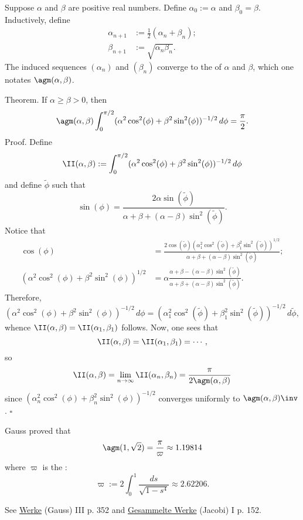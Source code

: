 \documentclass [preview, border = 20pt] {standalone}
\begin{document}
\pagecolor{black}
\color{white}
Suppose $\alpha$ and $\beta$ are positive real numbers. Define $\alpha_0 := \alpha$ and $\beta_0=\beta$. Inductively, define
\begin{align*}
\alpha_{n+1} &:= \frac{1}{2}(\alpha_n + \beta_n);\\
\beta_{n+1} &:= \sqrt{\alpha_n\beta_n}.
\end{align*}
The induced sequences $(\alpha_n)$ and $(\beta_n)$ converge to the  of $\alpha$ and $\beta$, which one notates $\agm (\alpha,\beta)$.

Theorem.\quad
If $\alpha\ge\beta>0$, then
\[
\agm (\alpha,\beta) \int_0^{\pi/2} (\alpha^2\cos^2(\phi) + \beta^2\sin^2(\phi))^{-1/2}\,d\phi = \frac{\pi}{2}.
\]
Proof.\quad
Define
\[
\II(\alpha,\beta) := \int_0^{\pi/2} (\alpha^2\cos^2(\phi) + \beta^2\sin^2(\phi))^{-1/2}\,d\phi
\]
and define $\tilde\phi$ such that
\[
\sin (\phi) = \frac{2\alpha\sin( \tilde \phi)}{\alpha+\beta+(\alpha-\beta)\sin^2(\tilde\phi)}.
\]
Notice that
\begin{align*}
\cos (\phi) &= \frac{2\cos(\tilde \phi)(\alpha_1^2 \cos^2(\tilde\phi) + \beta_1^2 \sin^2(\tilde \phi))^{1/2}}{\alpha+\beta+(\alpha-\beta)\sin^2(\tilde \phi)};\\
(\alpha^2\cos^2(\phi) + \beta^2\sin^2(\phi))^{1/2} &= \alpha\frac{\alpha+\beta-(\alpha-\beta)\sin^2(\tilde\phi)}{\alpha+\beta+(\alpha-\beta)\sin^2(\tilde\phi)}.
\end{align*}
Therefore,
\[
(\alpha^2\cos^2(\phi) + \beta^2\sin^2(\phi))^{-1/2}\,d\phi = (\alpha_1^2\cos^2(\tilde\phi) + \beta_1^2 \sin^2(\tilde\phi))^{-1/2}\, d\tilde \phi,
\]
whence $\II(\alpha,\beta) = \II(\alpha_1,\beta_1)$ follows.
Now, one sees that
\[
\II(\alpha,\beta) = \II(\alpha_1,\beta_1) = \cdots,
\]
so
\[
\II(\alpha,\beta) = \lim_{n\to\infty} \II(\alpha_n,\beta_n) = \frac{\pi}{2\agm (\alpha,\beta)}
\]
since $(\alpha_n^2\cos^2(\phi) + \beta_n^2\sin^2(\phi))^{-1/2}$ converges uniformly to $\agm (\alpha,\beta)\inv$.\hfill 
$\square$

Gauss proved that 
\[
\agm (1,\sqrt{2}) = \frac{\pi}{\varpi} \approx 1.19814
\]
where $\varpi$ is the :
\[
\varpi := 2\int_{0}^1\frac{ds}{\sqrt{1-s^4}}\approx 2.62206.
\]

\footnotesize
See \underline{Werke} (Gauss) III p. 352 and \underline{Gesammelte Werke} (Jacobi) I p. 152.
\end{document}
